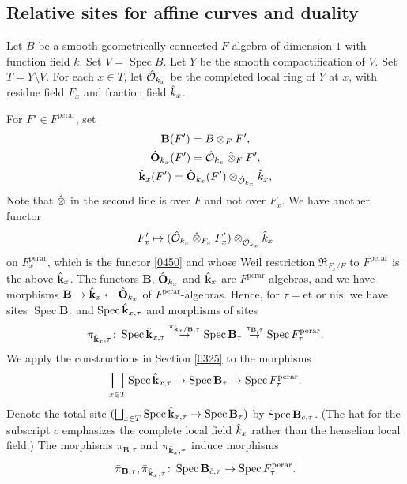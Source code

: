 \documentclass{amsart}
\theoremstyle{remark}
\numberwithin{equation}{subsection}
\newcommand{\Order}{\mathcal{O}}
\newcommand{\tensor}{\mathbin{\otimes}}
\newcommand{\et}{\mathrm{et}}
\newcommand{\perar}{\mathrm{perar}}
\newcommand{\alg}[1]{\mathbf{#1}}
\newcommand{\ctensor}{\mathbin{\Hat{\otimes}}}
\newcommand{\nis}{\mathrm{nis}}
\newcommand{\Weil}{\mathfrak{R}}
\DeclareMathOperator{\Spec}{Spec}
\begin{document}
\subsection{Relative sites for affine curves and duality}
\label{0333}

Let $B$ be a smooth geometrically connected $F$-algebra of dimension $1$
with function field $k$.
Set $V = \Spec B$.
Let $Y$ be the smooth compactification of $V$.
Set $T = Y \setminus V$.
For each $x \in T$,
let $\Hat{\Order}_{k_{x}}$ be the completed local ring of $Y$ at $x$,
with residue field $F_{x}$ and fraction field $\Hat{k}_{x}$.

For $F' \in F^{\perar}$, set
	\begin{gather*}
				\alg{B}(F')
			=
				B \tensor_{F} F',
		\\
				\Hat{\alg{O}}_{k_{x}}(F')
			=
				\Hat{\Order}_{k_{x}} \ctensor_{F} F',
		\\
				\Hat{\alg{k}}_{x}(F')
			=
				\Hat{\alg{O}}_{k_{x}}(F') \tensor_{\Hat{\Order}_{k_{x}}} \Hat{k}_{x},
	\end{gather*}
Note that $\Hat{\tensor}$ in the second line is over $F$ and not over $F_{x}$.
We have another functor
	\[
			F_{x}'
		\mapsto
			(\Hat{\Order}_{k_{x}} \ctensor_{F_{x}} F_{x}') \tensor_{\Hat{\Order}_{k_{x}}} \Hat{k}_{x}
	\]
on $F_{x}^{\perar}$,
which is the functor \eqref{0450} and
whose Weil restriction $\Weil_{F_{x} / F}$ to $F^{\perar}$ is the above $\Hat{\alg{k}}_{x}$.
The functors $\alg{B}$, $\Hat{\alg{O}}_{k_{x}}$ and $\Hat{\alg{k}}_{x}$ are $F^{\perar}$-algebras,
and we have morphisms $\alg{B} \to \Hat{\alg{k}}_{x} \gets \Hat{\alg{O}}_{k_{x}}$ of $F^{\perar}$-algebras.
Hence, for $\tau = \et$ or $\nis$, we have sites
$\Spec \alg{B}_{\tau}$ and $\Spec \Hat{\alg{k}}_{x, \tau}$ and morphisms of sites
	\[
			\pi_{\Hat{\alg{k}}_{x}, \tau}
		\colon
			\Spec \Hat{\alg{k}}_{x, \tau}
		\stackrel{\pi_{\Hat{\alg{k}}_{x} / \alg{B}, \tau}}{\to}
			\Spec \alg{B}_{\tau}
		\stackrel{\pi_{\alg{B}, \tau}}{\to}
			\Spec F^{\perar}_{\tau}.
	\]
We apply the constructions in Section \ref{0325} to
the morphisms
	\[
			\bigsqcup_{x \in T}
				\Spec \Hat{\alg{k}}_{x, \tau}
		\to
			\Spec \alg{B}_{\tau}
		\to
			\Spec F^{\perar}_{\tau}.
	\]
Denote the total site
$(\bigsqcup_{x \in T} \Spec \Hat{\alg{k}}_{x, \tau} \to \Spec \alg{B}_{\tau})$
by $\Spec \alg{B}_{\Hat{c}, \tau}$.
(The hat for the subscript $c$ emphasizes
the complete local field $\Hat{k}_{x}$ rather than the henselian local field.)
The morphisms $\pi_{\alg{B}, \tau}$ and $\pi_{\Hat{\alg{k}}_{x}, \tau}$ induce morphisms
	\[
			\Bar{\pi}_{\alg{B}, \tau},
			\Bar{\pi}_{\Hat{\alg{k}}_{x}, \tau}
		\colon
			\Spec \alg{B}_{\Hat{c}, \tau}
		\to
			\Spec F^{\perar}_{\tau}.
	\]
\end{document}
